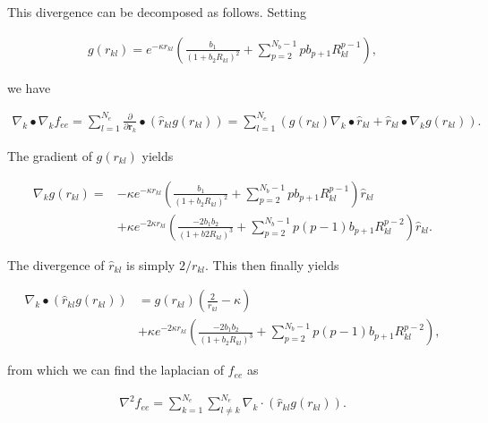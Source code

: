 \documentclass{article}
\begin{document}
This divergence can be decomposed as follows. Setting

\begin{align}
  g(r_{kl}) = e^{-\kappa r_{kl}} \left( \frac{b_1}{(1 + b_2 R_{kl})^2} 
    + \sum_{p=2}^{N_b - 1}pb_{p+1}R_{kl}^{p-1} \right),
\end{align}

we have

\begin{align}
  \nabla_k \bullet \nabla_k f_{ee} = \sum_{l=1}^{N_e}\frac{\partial}{\partial \mathbf{r}_k} 
    \bullet \left( \hat{r}_{kl} g(r_{kl}) \right)
    = \sum_{l=1}^{N_e}(g(r_{kl})\nabla_k \bullet \hat{r}_{kl} + \hat{r}_{kl} \bullet \nabla_k g(r_{kl})).
\end{align}

The gradient of $g(r_{kl})$ yields

\begin{align}
  \nabla_k g(r_{kl}) = &-\kappa e^{-\kappa r_{kl}}\left( 
    \frac{b_1}{(1 + b_2 R_{kl})^2} + \sum_{p=2}^{N_b - 1} p b_{p+1} R_{kl}^{p-1}
    \right)\hat{r}_{kl}\\
    & + \kappa e^{-2\kappa r_{kl}}\left( 
    \frac{-2b_1b_2}{(1 + b2R_{kl})^3} + \sum_{p=2}^{N_b - 1}p(p-1)b_{p+1}R_{kl}^{p-2} 
    \right)\hat{r}_{kl}.
\end{align}

The divergence of $\hat{r}_{kl}$ is simply $2/r_{kl}$. This then finally yields

\begin{align}
  \nabla_k \bullet (\hat{r}_{kl}g(r_{kl})) &= g(r_{kl})\left(\frac{2}{r_{kl}} - \kappa\right)\\
    &+ \kappa e^{-2\kappa r_{kl}}\left( 
      \frac{-2b_1b_2}{(1 + b_2R_{kl})^3} + \sum_{p=2}^{N_b - 1} p(p-1)b_{p+1}R_{kl}^{p-2}  
    \right),
\end{align}

from which we can find the laplacian of $f_{ee}$ as

\begin{align}
  \nabla^2 f_{ee} = \sum_{k=1}^{N_e} \sum_{l \neq k}^{N_e} \nabla_k 
    \cdot (\hat{r}_{kl}g(r_{kl})).
\end{align}
\end{document}
